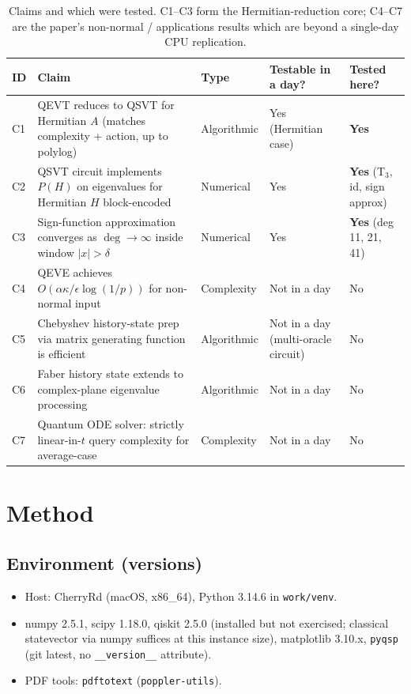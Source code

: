 \documentclass[11pt]{article}
\begin{document}
\begin{table}[h]\centering
\begin{tabular}{lllll}
\toprule
ID & Claim & Type & Testable in a day? & Tested here? \\
\midrule
C1 & QEVT reduces to QSVT for Hermitian $A$ (matches complexity + action, up to polylog) & Algorithmic & Yes (Hermitian case) & \textbf{Yes} \\
C2 & QSVT circuit implements $P(H)$ on eigenvalues for Hermitian $H$ block-encoded & Numerical & Yes & \textbf{Yes} (T$_3$, id, sign approx) \\
C3 & Sign-function approximation converges as $\deg\to\infty$ inside window $|x|>\delta$ & Numerical & Yes & \textbf{Yes} (deg 11, 21, 41) \\
C4 & QEVE achieves $O(\alpha\kappa/\epsilon\log(1/p))$ for non-normal input & Complexity & Not in a day & No \\
C5 & Chebyshev history-state prep via matrix generating function is efficient & Algorithmic & Not in a day (multi-oracle circuit) & No \\
C6 & Faber history state extends to complex-plane eigenvalue processing & Algorithmic & Not in a day & No \\
C7 & Quantum ODE solver: strictly linear-in-$t$ query complexity for average-case & Complexity & Not in a day & No \\
\bottomrule
\end{tabular}
\caption{Claims and which were tested. C1--C3 form the Hermitian-reduction
core; C4--C7 are the paper's non-normal / applications results which are
beyond a single-day CPU replication.}
\end{table}

\section{Method}

\subsection{Environment (versions)}
\begin{itemize}
  \item Host: CherryRd (macOS, x86\_64), Python 3.14.6 in \texttt{work/venv}.
  \item numpy 2.5.1, scipy 1.18.0, qiskit 2.5.0 (installed but not
        exercised; classical statevector via numpy suffices at this
        instance size), matplotlib 3.10.x, \texttt{pyqsp} (git latest,
        no \texttt{\_\_version\_\_} attribute).
  \item PDF tools: \texttt{pdftotext} (\texttt{poppler-utils}).
\end{itemize}
\end{document}
